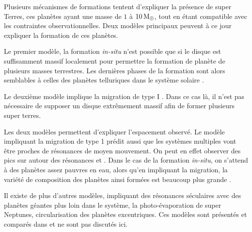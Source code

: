 \bigskip

Plusieurs mécanismes de formations tentent d'expliquer la présence de super Terres, ces planètes ayant une masse de $1$ à $10\mathrm{\thinspace M_\oplus}$, tout en étant compatible avec les contraintes observationnelles. Deux modèles principaux peuvent à ce jour expliquer la formation de ces planètes. 

Le premier modèle, la \og formation \textit{in-situ}\fg \citep{chiang2013minimum} n'est possible que si le disque est suffisamment massif localement pour permettre la formation de planète de plusieurs masses terrestres. Les dernières phases de la formation sont alors semblables à celles des planètes telluriques dans le système solaire \citep{wetherill1990formation, kenyon2006terrestrial}.

Le deuxième modèle implique la migration de type I \citep{terquem2007migration}. Dans ce cas là, il n'est pas nécessaire de supposer un disque extrêmement massif afin de former plusieurs super terres. 

Les deux modèles permettent d'expliquer l'espacement observé. Le modèle impliquant la migration de type 1 prédit aussi que les systèmes multiples vont être proches de résonances de moyen mouvement. On peut en effet observer des pics sur  autour des résonances  et . Dans le cas de la formation \textit{in-situ}, on s'attend à des planètes assez pauvres en eau, alors qu'en impliquant la migration, la variété de composition des planètes ainsi formées est beaucoup plus grande \citep{raymond2008observable}.

Il existe de plus d'autres modèles, impliquant des résonances séculaires avec des planètes géantes plus loin dans le système, la photo-évaporation de super Neptunes, circularisation des planètes excentriques. Ces modèles sont présentés et comparés dans \cite{raymond2008observable} et ne sont pas discutés ici. 

%
%


